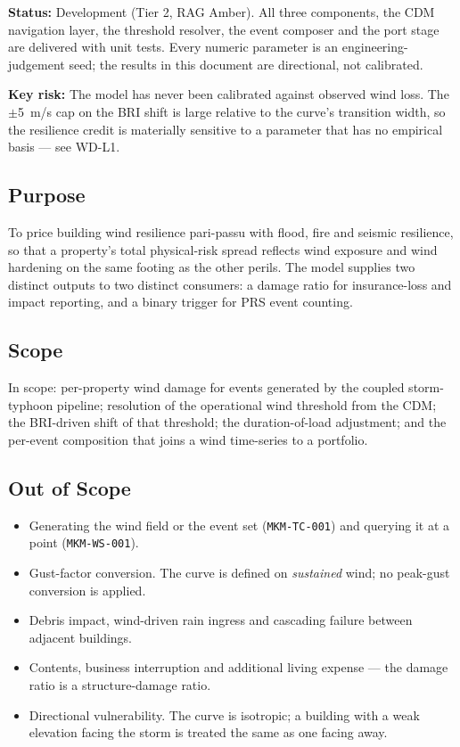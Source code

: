 \documentclass[11pt,a4paper]{article}
\begin{document}
\textbf{Status:} Development (Tier 2, RAG Amber). All three components, the CDM
navigation layer, the threshold resolver, the event composer and the port stage
are delivered with unit tests. Every numeric parameter is an
engineering-judgement seed; the results in this document are directional, not
calibrated.

\textbf{Key risk:} The model has never been calibrated against observed wind
loss. The $\pm$5~m/s cap on the BRI shift is large relative to the curve's
transition width, so the resilience credit is materially sensitive to a
parameter that has no empirical basis --- see WD-L1.

\mkmpurpose

\subsection{Purpose}
To price building wind resilience pari-passu with flood, fire and seismic
resilience, so that a property's total physical-risk spread reflects wind
exposure and wind hardening on the same footing as the other perils. The model
supplies two distinct outputs to two distinct consumers: a damage ratio for
insurance-loss and impact reporting, and a binary trigger for PRS event counting.

\subsection{Scope}
In scope: per-property wind damage for events generated by the coupled
storm-typhoon pipeline; resolution of the operational wind threshold from the
CDM; the BRI-driven shift of that threshold; the duration-of-load adjustment;
and the per-event composition that joins a wind time-series to a portfolio.

\subsection{Out of Scope}
\begin{itemize}
  \item Generating the wind field or the event set (\texttt{MKM-TC-001}) and
        querying it at a point (\texttt{MKM-WS-001}).
  \item Gust-factor conversion. The curve is defined on \emph{sustained} wind;
        no peak-gust conversion is applied.
  \item Debris impact, wind-driven rain ingress and cascading failure between
        adjacent buildings.
  \item Contents, business interruption and additional living expense --- the
        damage ratio is a structure-damage ratio.
  \item Directional vulnerability. The curve is isotropic; a building with a
        weak elevation facing the storm is treated the same as one facing away.
\end{itemize}
\end{document}
